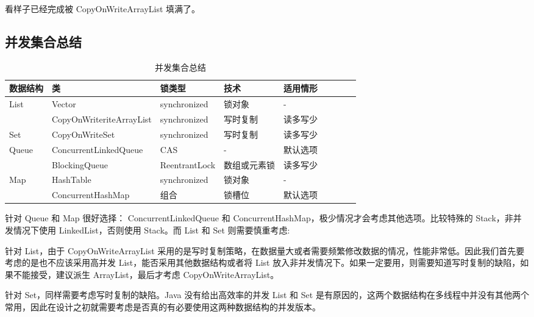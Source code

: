 看样子已经完成被 CopyOnWriteArrayList 填满了。

\subsection*{并发集合总结}

\begin{table}[H]
    \centering
    \caption{并发集合总结}
    \label{table:并发集合总结}
    \setlength{\tabcolsep}{4mm}
    \begin{tabular}{l|l|l|llllll}
        \toprule
        \textbf{数据结构} & \textbf{类} & \textbf{锁类型} & \textbf{技术} & \textbf{适用情形} \\ 
        \midrule
        \multirow{2}{*}{List} & Vector & synchronized & 锁对象 & - \\
         & CopyOnWriteriteArrayList & synchronized & 写时复制 & 读多写少 \\
        \midrule
        \multirow{1}{*}{Set} & CopyOnWriteSet & synchronized & 写时复制 & 读多写少 \\
        \midrule
        \multirow{2}{*}{Queue} & ConcurrentLinkedQueue & CAS & - & 默认选项 \\
         & BlockingQueue & ReentrantLock & 数组或元素锁 & 读多写少 \\
         \midrule
         \multirow{2}{*}{Map} & HashTable & synchronized & 锁对象 & - \\
          & ConcurrentHashMap & 组合 & 锁槽位 & 默认选项 \\
        \bottomrule
    \end{tabular}
\end{table}

针对 Queue 和 Map 很好选择： ConcurrentLinkedQueue 和 ConcurrentHashMap，极少情况才会考虑其他选项。比较特殊的 Stack，非并发情况下使用 LinkedList，否则使用 Stack。而 List 和 Set 则需要慎重考虑:

针对 List，由于 CopyOnWriteArrayList 采用的是写时复制策略，在数据量大或者需要频繁修改数据的情况，性能非常低。因此我们首先要考虑的是也不应该采用高并发 List，能否采用其他数据结构或者将 List 放入非并发情况下。如果一定要用，则需要知道写时复制的缺陷，如果不能接受，建议派生 ArrayList，最后才考虑 CopyOnWriteArrayList。

针对 Set，同样需要考虑写时复制的缺陷。Java 没有给出高效率的并发 List 和 Set 是有原因的，这两个数据结构在多线程中并没有其他两个常用，因此在设计之初就需要考虑是否真的有必要使用这两种数据结构的并发版本。

\newpage